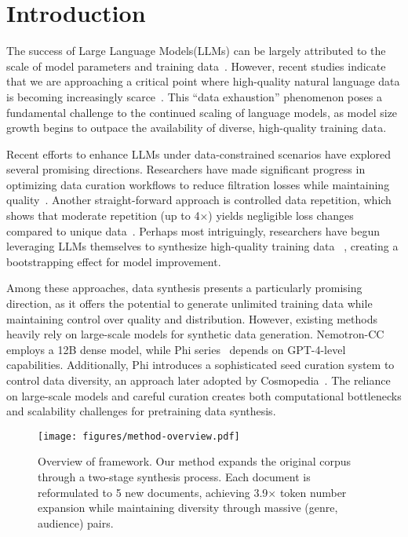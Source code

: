 \section{Introduction}
\label{sec:intoduction}
The success of Large Language Models(LLMs) can be largely attributed to the scale of model parameters and training data~\citep{kaplan2020scaling,hoffmann2022empirical}. 
However, recent studies indicate that we are approaching a critical point where high-quality natural language data is becoming increasingly scarce~\citep{villalobos2022will}.
This ``data exhaustion'' phenomenon poses a fundamental challenge to the continued scaling of language models, as model size growth begins to outpace the availability of diverse, high-quality training data.

Recent efforts to enhance LLMs under data-constrained scenarios have explored several promising directions. 
Researchers have made significant progress in optimizing data curation workflows to reduce filtration losses while maintaining quality~\citep{su2024nemotron, penedo2024finewebdatasets}. 
Another straight-forward approach is controlled data repetition, which shows that moderate repetition (up to 4×) yields negligible loss changes compared to unique data~\citep{muennighoff2023scaling}. 
Perhaps most intriguingly, researchers have begun leveraging LLMs themselves to synthesize high-quality training data ~\citep{abdin2024phi, su2024nemotron}, creating a bootstrapping effect for model improvement.

Among these approaches, data synthesis presents a particularly promising direction, as it offers the potential to generate unlimited training data while maintaining control over quality and distribution.
However, existing methods heavily rely on large-scale models for synthetic data generation. 
Nemotron-CC~\citep{su2024nemotron} employs a 12B dense model, 
while Phi series~\citep{abdin2024phi} depends on GPT-4-level capabilities.
Additionally, Phi introduces a sophisticated seed curation system to control data diversity,
an approach later adopted by Cosmopedia~\citep{benallal2024smollmcorpus}. 
The reliance on large-scale models and careful curation creates both computational bottlenecks 
and scalability challenges for pretraining data synthesis. 

\begin{figure*}[t]
    \vspace{-4em}
    \centering
    \texttt{[image: figures/method-overview.pdf]}
    \vspace{-2em}
    \caption{Overview of {\ours} framework. Our method expands the original corpus through a two-stage synthesis process. Each document is reformulated to 5 new documents, achieving 3.9× token number expansion while maintaining diversity through massive (genre, audience) pairs.}
    \label{fig:method-overview}
\end{figure*}


